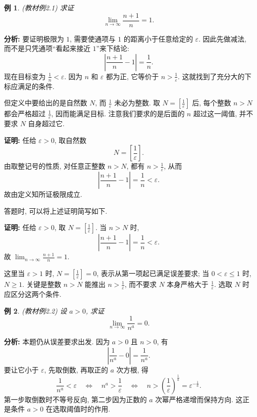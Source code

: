 \documentclass[UTF8,openany]{ctexbook}
\theoremstyle{chinesetextbook}
\newtheorem{example}{例}[section]
\newenvironment{cnproof}{\par\indent\textbf{证明:} \ignorespaces}{\par}
\begin{document}
\begin{example}
\textnormal{(教材例2.1)} 求证
\[
\lim_{n\to\infty}\frac{n+1}{n}=1.
\]
\end{example}

\par\indent\textbf{分析:} 要证明极限为 $1$, 需要使通项与 $1$ 的距离小于任意给定的 $\varepsilon$. 因此先做减法, 而不是只凭通项“看起来接近 $1$”来下结论:
\[
\left|\frac{n+1}{n}-1\right|=\frac1n.
\]
现在目标变为 $\displaystyle\frac1n<\varepsilon$. 因为 $n$ 和 $\varepsilon$ 都为正, 它等价于 $\displaystyle n>\frac1\varepsilon$. 这就找到了充分大的下标应满足的条件.

但定义中要给出的是自然数 $N$, 而 $\displaystyle\frac1\varepsilon$ 未必为整数. 取 $\displaystyle N=\left[\frac1\varepsilon\right]$ 后, 每个整数 $n>N$ 都会严格超过 $\displaystyle\frac1\varepsilon$, 因而能满足目标. 注意我们要求的是后面的 $n$ 超过这一阈值, 并不要求 $N$ 自身超过它.

\begin{cnproof}
任给 $\varepsilon>0$, 取自然数
\[
N=\left[\frac1\varepsilon\right].
\]
由取整记号的性质, 对任意正整数 $n>N$, 都有 $\displaystyle n>\frac{1}{\varepsilon}$, 从而
\[
\left|\frac{n+1}{n}-1\right|=\frac1n<\varepsilon.
\]
故由定义知所证极限成立.
\end{cnproof}

答题时, 可以将上述证明简写如下.

\begin{cnproof}
任给 $\varepsilon>0$, 取 $\displaystyle N=[\frac{1}{\varepsilon}]$. 当 $n>N$ 时,
\[
\left|\frac{n+1}{n}-1\right|=\frac1n<\varepsilon.
\]
故 $\displaystyle \lim_{n\to\infty}\frac{n+1}{n}=1$.
\end{cnproof}

这里当 $\varepsilon>1$ 时, $\displaystyle N=[\frac{1}{\varepsilon}]=0$, 表示从第一项起已满足误差要求; 当 $0<\varepsilon\le1$ 时, $N\ge1$. 关键是整数 $n>N$ 能推出 $\displaystyle n>\frac{1}{\varepsilon}$, 而不要求 $N$ 本身严格大于 $\displaystyle \frac{1}{\varepsilon}$. 选取 $N$ 时应区分这两个条件.

\begin{example}
\textnormal{(教材例2.2)} 设 $a>0$, 求证
\[
\lim_{n\to\infty}\frac1{n^a}=0.
\]
\end{example}

\par\indent\textbf{分析:} 本题仍从误差要求出发. 因为 $a>0$ 且 $n>0$, 有
\[
\left|\frac1{n^a}-0\right|=\frac1{n^a}.
\]
要让它小于 $\varepsilon$, 先取倒数, 再取正的 $a$ 次方根, 得
\[
\frac1{n^a}<\varepsilon
\quad\Longleftrightarrow\quad
n^a>\frac1\varepsilon
\quad\Longleftrightarrow\quad
n>\left(\frac1\varepsilon\right)^{\frac1a}
=\varepsilon^{-\frac1a}.
\]
第一步取倒数时不等号反向, 第二步因为正数的 $a$ 次幂严格递增而保持方向. 这正是条件 $a>0$ 在选取阈值时的作用.
\end{document}
